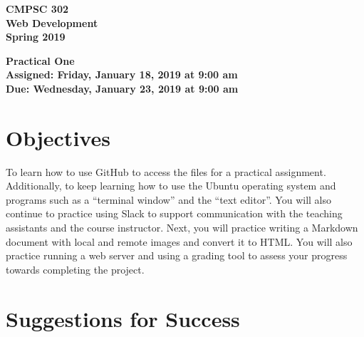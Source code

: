 \documentclass[11pt]{article}
\newcommand{\assignmentduedate}{January 23}
\newcommand{\assignmentassignedate}{January 18}
\newcommand{\assignmentnumber}{One}
\newcommand{\labyear}{2019}
\newcommand{\labdueday}{Wednesday}
\newcommand{\labassignday}{Friday}
\newcommand{\labtime}{9:00 am}
\newcommand{\assigneddate}{Assigned: \labassignday, \assignmentassignedate, \labyear{} at \labtime{}}
\newcommand{\duedate}{Due: \labdueday, \assignmentduedate, \labyear{} at \labtime{}}
\newcommand{\labtitle}[1] { \begin{center} \begin{center} \bf CMPSC 302\\Web
Development\\ Spring 2019\\ \medskip \end{center} \bf #1 \end{center} }
\begin{document}
\thispagestyle{empty}

\labtitle{Practical \assignmentnumber{} \\ \assigneddate{} \\ \duedate{}}

\section*{Objectives}

To learn how to use GitHub to access the files for a practical assignment.
Additionally, to keep learning how to use the Ubuntu operating system and
programs such as a ``terminal window'' and the ``text editor''. You will also
continue to practice using Slack to support communication with the teaching
assistants and the course instructor. Next, you will practice writing a Markdown
document with local and remote images and convert it to HTML. You will also
practice running a web server and using a grading tool to assess your progress
towards completing the project.

\section*{Suggestions for Success}
\end{document}
